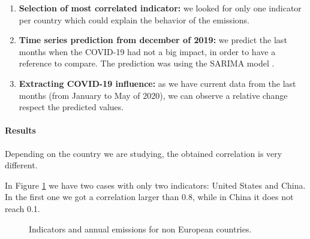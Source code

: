 \begin{enumerate}
	\item \textbf{Selection of most correlated indicator:} we looked for only one indicator per country which could explain the behavior of the emissions. 
	\item \textbf{Time series prediction from december of 2019:} we predict the last months when the COVID-19 had not a big impact, in order to have a reference to compare. The prediction was using the SARIMA model \cite{sarima}. 
	\item \textbf{Extracting COVID-19 influence:} as we have current data from the last months (from January to May of 2020), we can observe a relative change respect the predicted values.
\end{enumerate}


\paragraph{Results}
Depending on the country we are studying, the obtained correlation is very different. 

In Figure \ref{fig:indicators_EEUU_China} we have two cases with only two indicators: United States and China. In the first one we got a correlation larger than 0.8, while in China it does not reach 0.1.
\begin{figure}[h!]
	\centering
	\caption{Indicators and annual emissions for non European countries.}
	\label{fig:indicators_EEUU_China}
\end{figure}

